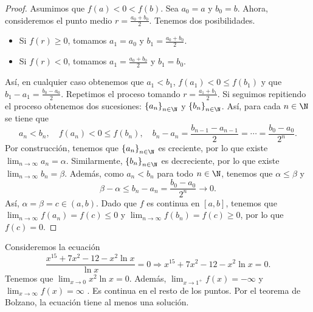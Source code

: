 \begin{proof}
Asumimos que $\displaystyle f\left(a\right) < 0 < f\left(b\right) $. Sea $\displaystyle a_{0} = a $ y $\displaystyle b_{0} = b $. Ahora, consideremos el punto medio $\displaystyle r = \frac{a_{0}+b_{0}}{2} $. Tenemos dos posibilidades.
\begin{itemize}
\item Si $\displaystyle f\left(r\right) \geq 0 $, tomamos $\displaystyle a_{1} = a_{0} $ y $\displaystyle b_{1} = \frac{a_{0}+b_{0}}{2} $.
\item Si $\displaystyle f\left(r\right) < 0 $, tomamos $\displaystyle a_{1} = \frac{a_{0}+b_{0}}{2} $ y $\displaystyle b_{1} = b_{0} $.
\end{itemize}
Así, en cualquier caso obtenemos que $\displaystyle a_{1} < b_{1} $, $\displaystyle f\left(a_{1}\right) < 0 \leq f\left(b_{1}\right) $ y que $\displaystyle b_{1}-a_{1} = \frac{b_{0}-a_{0}}{2} $. Repetimos el proceso tomando $\displaystyle r = \frac{a_{1}+b_{1}}{2}$. Si seguimos repitiendo el proceso obtenemos dos sucesiones: $\displaystyle \left\{ a_{n}\right\} _{n\in\N} $ y $\displaystyle \left\{ b_{n}\right\} _{n\in\N} $.
Así, para cada $\displaystyle n \in \N $ se tiene que 
\[a_{n} < b_{n}, \quad f\left(a_{n}\right) < 0 \leq f\left(b_{n}\right), \quad b_{n}-a_{n} = \frac{b_{n-1}-a_{n-1}}{2} = \cdots = \frac{b_{0}-a_{0}}{2^{n}} .\]
Por construcción, tenemos que $\displaystyle \left\{ a_{n}\right\} _{n\in\N} $ es creciente, por lo que existe $\displaystyle \lim_{n \to \infty}a_{n} = \alpha  $. Similarmente, $\displaystyle \left\{ b_{n}\right\} _{n\in\N} $ es decreciente, por lo que existe $\displaystyle \lim_{n \to \infty}b_{n}= \beta  $. 
Además, como $\displaystyle a_{n} < b_{n} $ para todo $\displaystyle n \in \N $, tenemos que $\displaystyle \alpha \leq \beta  $ y
\[\beta - \alpha \leq b_{n}-a_{n} = \frac{b_{0}-a_{0}}{2^{n}} \to 0 .\]
Así, $\displaystyle \alpha = \beta = c \in \left(a,b\right) $. Dado que $\displaystyle f $ es continua en $\displaystyle \left[a,b\right]  $, tenemos que $\displaystyle \lim_{n \to \infty}f\left(a_{n}\right) = f\left(c\right) \leq 0 $ y $\displaystyle \lim_{n \to \infty}f\left(b_{n}\right) = f\left(c\right) \geq 0 $, por lo que $\displaystyle f\left(c\right) = 0 $.
\end{proof}
\begin{eg}
\normalfont Consideremos la ecuación
\[ \frac{x^{15}+7x^{2}-12-x^{2}\ln x}{\ln x} = 0 \Rightarrow x^{15} + 7x^{2} - 12 - x^{2}\ln x = 0 .\]
Tenemos que $\displaystyle \lim_{x \to 0}x^{2}\ln x = 0 $. Además, $\displaystyle \lim_{x \to 1^{+}}f\left(x\right)= - \infty $ y $\displaystyle \lim_{x \to \infty}f\left(x\right) =\infty $ . Es continua en el resto de los puntos. Por el teorema de Bolzano, la ecuación tiene al menos una solución.
\end{eg}
